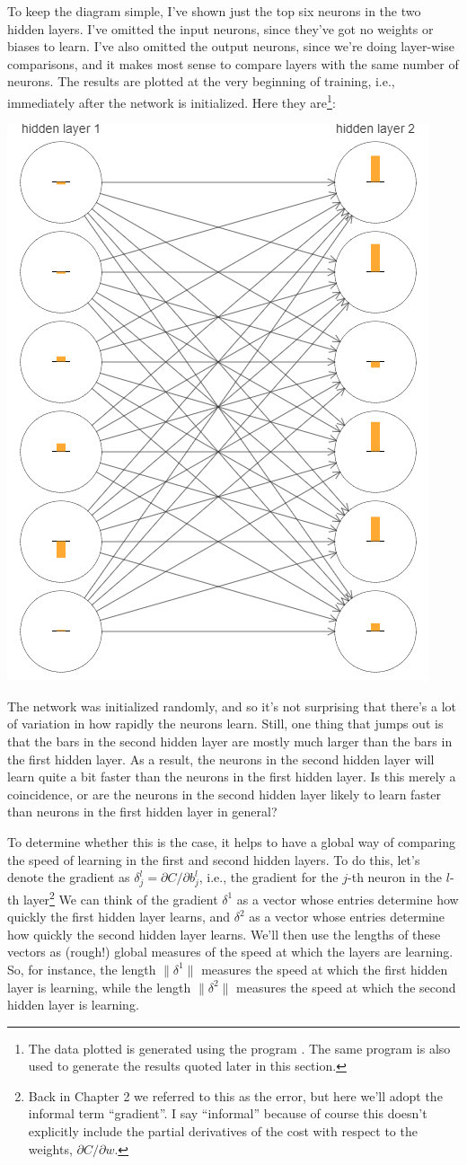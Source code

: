 \documentclass[a4paper,twoside,10pt]{book}
\begin{document}
To keep the diagram simple, I've shown just the top six neurons in the two hidden layers. I've omitted the input neurons, since they've got no weights or biases to learn. I've also omitted the output neurons, since we're doing layer-wise comparisons, and it makes most sense to compare layers with the same number of neurons. The results are plotted at the very beginning of training, i.e., immediately after the network is initialized. Here they are\footnote{The data plotted is generated using the program . The same program is also used to generate the results quoted later in this section.}:
\begin{center}
	\includegraphics[width=0.5\linewidth]{figures/ch5/tikz500}
\end{center}
The network was initialized randomly, and so it's not surprising that there's a lot of variation in how rapidly the neurons learn. Still, one thing that jumps out is that the bars in the second hidden layer are mostly much larger than the bars in the first hidden layer. As a result, the neurons in the second hidden layer will learn quite a bit faster than the neurons in the first hidden layer. Is this merely a coincidence, or are the neurons in the second hidden layer likely to learn faster than neurons in the first hidden layer in general?

To determine whether this is the case, it helps to have a global way of comparing the speed of learning in the first and second hidden layers. To do this, let's denote the gradient as $\delta^l_j=\partial C/\partial b^l_j$, i.e., the gradient for the $j$-th neuron in the $l$-th layer\footnote{Back in Chapter 2 we referred to this as the error, but here we'll adopt the informal term ``gradient''. I say ``informal'' because of course this doesn't explicitly include the partial derivatives of the cost with respect to the weights, $\partial C/\partial w$.}  We can think of the gradient $\delta^1$ as a vector whose entries determine how quickly the first hidden layer learns, and $\delta^2$ as a vector whose entries determine how quickly the second hidden layer learns. We'll then use the lengths of these vectors as (rough!) global measures of the speed at which the layers are learning. So, for instance, the length $\|\delta^1\|$ measures the speed at which the first hidden layer is learning, while the length $\|\delta^2\|$ measures the speed at which the second hidden layer is learning.
\end{document}
